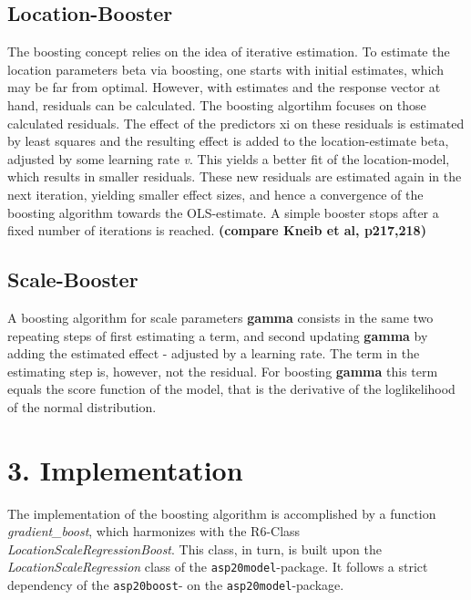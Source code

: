 \documentclass[
]{report}
\begin{document}
\hypertarget{location-booster}{%
\section{Location-Booster}\label{location-booster}}

The boosting concept relies on the idea of iterative estimation. To
estimate the location parameters beta via boosting, one starts with
initial estimates, which may be far from optimal. However, with
estimates and the response vector at hand, residuals can be calculated.
The boosting algortihm focuses on those calculated residuals. The effect
of the predictors xi on these residuals is estimated by least squares
and the resulting effect is added to the location-estimate beta,
adjusted by some learning rate \emph{v}. This yields a better fit of the
location-model, which results in smaller residuals. These new residuals
are estimated again in the next iteration, yielding smaller effect
sizes, and hence a convergence of the boosting algorithm towards the
OLS-estimate. A simple booster stops after a fixed number of iterations
is reached. \textbf{(compare Kneib et al, p217,218)}

\hypertarget{scale-booster}{%
\section{Scale-Booster}\label{scale-booster}}

A boosting algorithm for scale parameters \textbf{gamma} consists in the
same two repeating steps of first estimating a term, and second updating
\textbf{gamma} by adding the estimated effect - adjusted by a learning
rate. The term in the estimating step is, however, not the residual. For
boosting \textbf{gamma} this term equals the score function of the
model, that is the derivative of the loglikelihood of the normal
distribution.

\hypertarget{implementation}{%
\chapter{3. Implementation}\label{implementation}}

The implementation of the boosting algorithm is accomplished by a
function \emph{gradient\_boost}, which harmonizes with the R6-Class
\emph{LocationScaleRegressionBoost}. This class, in turn, is built upon
the \emph{LocationScaleRegression} class of the
\texttt{asp20model}-package. It follows a strict dependency of the
\texttt{asp20boost}- on the \texttt{asp20model}-package.
\end{document}
